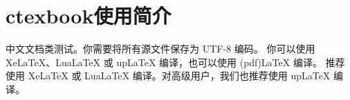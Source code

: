\chapter{ctexbook使用简介}

中文文档类测试。你需要将所有源文件保存为 UTF-8 编码。
你可以使用 XeLaTeX、LuaLaTeX 或 upLaTeX 编译，也可以使用 (pdf)LaTeX 编译。
推荐使用 XeLaTeX 或 LuaLaTeX 编译。对高级用户，我们也推荐使用 upLaTeX 编译。

